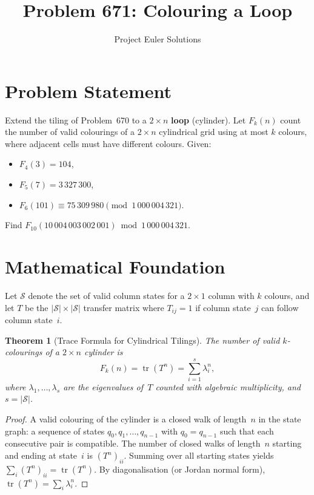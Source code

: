 \documentclass[11pt]{article}
\title{Problem 671: Colouring a Loop}
\author{Project Euler Solutions}
\date{}
\newtheorem{theorem}{Theorem}
\begin{document}
\maketitle

\section{Problem Statement}

Extend the tiling of Problem~670 to a $2 \times n$ \textbf{loop} (cylinder). Let $F_k(n)$ count the number of valid colourings of a $2 \times n$ cylindrical grid using at most $k$ colours, where adjacent cells must have different colours. Given:
\begin{itemize}
  \item $F_4(3) = 104$,
  \item $F_5(7) = 3\,327\,300$,
  \item $F_6(101) \equiv 75\,309\,980 \pmod{1\,000\,004\,321}$.
\end{itemize}
Find $F_{10}(10\,004\,003\,002\,001) \bmod 1\,000\,004\,321$.

\section{Mathematical Foundation}

Let $\mathcal{S}$ denote the set of valid column states for a $2 \times 1$ column with $k$ colours, and let $T$ be the $|\mathcal{S}| \times |\mathcal{S}|$ transfer matrix where $T_{ij} = 1$ if column state~$j$ can follow column state~$i$.

\begin{theorem}[Trace Formula for Cylindrical Tilings]
The number of valid $k$-colourings of a $2 \times n$ cylinder is
\[
  F_k(n) = \operatorname{tr}(T^n) = \sum_{i=1}^{s} \lambda_i^n,
\]
where $\lambda_1, \ldots, \lambda_s$ are the eigenvalues of~$T$ counted with algebraic multiplicity, and $s = |\mathcal{S}|$.
\end{theorem}

\begin{proof}
A valid colouring of the cylinder is a closed walk of length~$n$ in the state graph: a sequence of states $q_0, q_1, \ldots, q_{n-1}$ with $q_0 = q_{n-1}$ such that each consecutive pair is compatible. The number of closed walks of length~$n$ starting and ending at state~$i$ is $(T^n)_{ii}$. Summing over all starting states yields $\sum_i (T^n)_{ii} = \operatorname{tr}(T^n)$. By diagonalisation (or Jordan normal form), $\operatorname{tr}(T^n) = \sum_i \lambda_i^n$.
\end{proof}
\end{document}
